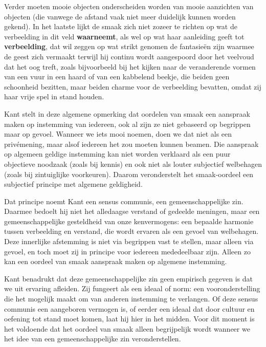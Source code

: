 Verder moeten mooie objecten onderscheiden worden van mooie aanzichten van objecten (die vanwege de afstand vaak niet meer duidelijk kunnen worden gekend). In het laatste lijkt de smaak zich niet zozeer te richten op wat de verbeelding in dit veld \textbf{waarneemt}, als wel op wat haar aanleiding geeft tot \textbf{verbeelding}, dat wil zeggen op wat strikt genomen de fantasieën zijn waarmee de geest zich vermaakt terwijl hij continu wordt aangespoord door het veelvoud dat het oog treft, zoals bijvoorbeeld bij het kijken naar de veranderende vormen van een vuur in een haard of van een kabbelend beekje, die beiden geen schoonheid bezitten, maar beiden charme voor de verbeelding bevatten, omdat zij haar vrije spel in stand houden.

\begin{mdframed}[leftmargin=0pt,rightmargin=0pt,backgroundcolor=blue!6,linecolor=white,innertopmargin=6pt,innerbottommargin=6pt]
Kant stelt in deze algemene opmerking dat oordelen van smaak een aanspraak maken op instemming van iedereen, ook al zijn ze niet gebaseerd op begrippen maar op gevoel. Wanneer we iets mooi noemen, doen we dat niet als een privémening, maar alsof iedereen het zou moeten kunnen beamen. Die aanspraak op algemeen geldige instemming kan niet worden verklaard als een puur objectieve noodzaak (zoals bij kennis) en ook niet als louter subjectief welbehagen (zoals bij zintuiglijke voorkeuren). Daarom veronderstelt het smaak-oordeel een subjectief principe met algemene geldigheid.

Dat principe noemt Kant een sensus communis, een gemeenschappelijke zin. Daarmee bedoelt hij niet het alledaagse verstand of gedeelde meningen, maar een gemeenschappelijke gesteldheid van onze kenvermogens: een bepaalde harmonie tussen verbeelding en verstand, die wordt ervaren als een gevoel van welbehagen. Deze innerlijke afstemming is niet via begrippen vast te stellen, maar alleen via gevoel, en toch moet zij in principe voor iedereen mededeelbaar zijn. Alleen zo kan een oordeel van smaak aanspraak maken op algemene instemming.

Kant benadrukt dat deze gemeenschappelijke zin geen empirisch gegeven is dat we uit ervaring afleiden. Zij fungeert als een ideaal of norm: een vooronderstelling die het mogelijk maakt om van anderen instemming te verlangen. Of deze sensus communis een aangeboren vermogen is, of eerder een ideaal dat door cultuur en oefening tot stand moet komen, laat hij hier in het midden. Voor dit moment is het voldoende dat het oordeel van smaak alleen begrijpelijk wordt wanneer we het idee van een gemeenschappelijke zin veronderstellen.


\end{mdframed}
